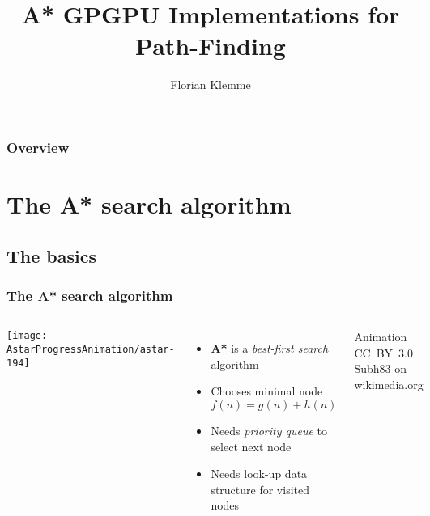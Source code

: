 \documentclass{beamer}
\begin{document}
\title{A* GPGPU Implementations for Path-Finding}
\author{Florian Klemme}
\frame{\titlepage}

\begin{frame}
    \frametitle{Overview}
    \tableofcontents
\end{frame}

\section{The A* search algorithm}
\subsection{The basics}
\begin{frame}
    \frametitle{The A* search algorithm}
    \begin{columns}
        \texttt{[image: AstarProgressAnimation/astar-194]}
        
        \begin{itemize}
            \item \textbf{A*} is a \emph{best-first search} algorithm
            \item Chooses minimal node \(f(n) = g(n) + h(n)\)
            \item Needs \emph{priority queue} to select next node
            \item Needs look-up data structure for visited nodes
        \end{itemize}
        
        \vspace{1em}
        Animation CC~BY~3.0 Subh83 on wikimedia.org
    \end{columns}
\end{frame}
\end{document}
